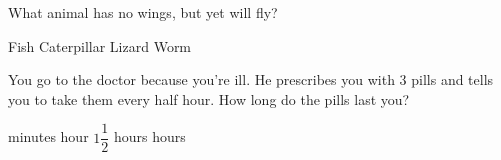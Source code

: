 \begin{questions}
\question What animal has no wings, but yet will fly?
\begin{multicols}{4}
\begin{choices}  
\choice Fish
\CorrectChoice Caterpillar 
\choice Lizard 
\choice Worm
\end{choices}
\end{multicols} 

\question You go to the doctor because you're ill. He prescribes you with 3 pills and tells you to take them every half hour. How long do the pills last you?
\begin{multicols}{4}
\begin{choices} 
 minutes 
 hour
\choice $1\dfrac{1}{2}$ hours 
 hours 
\end{choices}
\end{multicols} 

\end{questions}